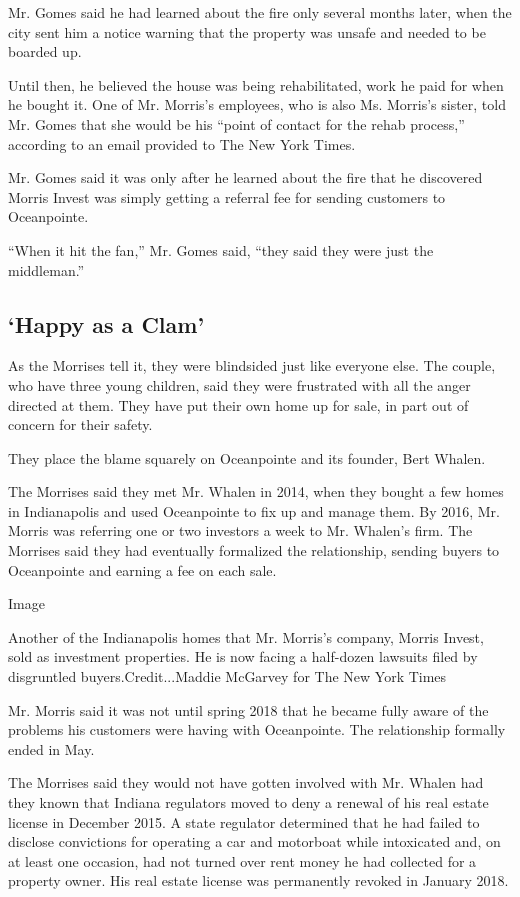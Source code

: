 Mr. Gomes said he had learned about the fire only several months later,
when the city sent him a notice warning that the property was unsafe and
needed to be boarded up.

Until then, he believed the house was being rehabilitated, work he paid
for when he bought it. One of Mr. Morris's employees, who is also Ms.
Morris's sister, told Mr. Gomes that she would be his ``point of contact
for the rehab process,'' according to an email provided to The New York
Times.

Mr. Gomes said it was only after he learned about the fire that he
discovered Morris Invest was simply getting a referral fee for sending
customers to Oceanpointe.

``When it hit the fan,'' Mr. Gomes said, ``they said they were just the
middleman.''

\hypertarget{happy-as-a-clam}{%
\subsection{`Happy as a Clam'}\label{happy-as-a-clam}}

As the Morrises tell it, they were blindsided just like everyone else.
The couple, who have three young children, said they were frustrated
with all the anger directed at them. They have put their own home up for
sale, in part out of concern for their safety.

They place the blame squarely on Oceanpointe and its founder, Bert
Whalen.

The Morrises said they met Mr. Whalen in 2014, when they bought a few
homes in Indianapolis and used Oceanpointe to fix up and manage them. By
2016, Mr. Morris was referring one or two investors a week to Mr.
Whalen's firm. The Morrises said they had eventually formalized the
relationship, sending buyers to Oceanpointe and earning a fee on each
sale.

Image

Another of the Indianapolis homes that Mr. Morris's company, Morris
Invest, sold as investment properties. He is now facing a half-dozen
lawsuits filed by disgruntled buyers.Credit...Maddie McGarvey for The
New York Times

Mr. Morris said it was not until spring 2018 that he became fully aware
of the problems his customers were having with Oceanpointe. The
relationship formally ended in May.

The Morrises said they would not have gotten involved with Mr. Whalen
had they known that Indiana regulators moved to deny a renewal of his
real estate license in December 2015. A state regulator determined that
he had failed to disclose convictions for operating a car and motorboat
while intoxicated and, on at least one occasion, had not turned over
rent money he had collected for a property owner. His real estate
license was permanently revoked in January 2018.

